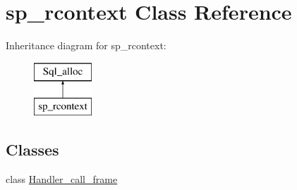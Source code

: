 \hypertarget{classsp__rcontext}{}\section{sp\+\_\+rcontext Class Reference}
\label{classsp__rcontext}
Inheritance diagram for sp\+\_\+rcontext\+:\begin{figure}[H]
\begin{center}
\leavevmode
\includegraphics[height=2.000000cm]{classsp__rcontext}
\end{center}
\end{figure}
\subsection*{Classes}
\begin{DoxyCompactItemize}
\item 
class \mbox{\hyperlink{classsp__rcontext_1_1Handler__call__frame}{Handler\+\_\+call\+\_\+frame}}
\end{DoxyCompactItemize}
